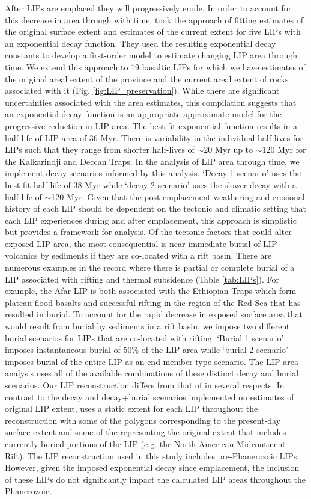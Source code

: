 \documentclass[11pt,letterpaper]{article}
\begin{document}
After LIPs are emplaced they will progressively erode. In order to account for this decrease in area through with time, \cite{Godderis2017a} took the approach of fitting estimates of the original surface extent and estimates of the current extent for five LIPs with an exponential decay function. They used the resulting exponential decay constants to develop a first-order model to estimate changing LIP area through time. We extend this approach to 19 basaltic LIPs for which we have estimates of the original areal extent of the province and the current areal extent of rocks associated with it (Fig. \ref{fig:LIP_preservation}). While there are significant uncertainties associated with the area estimates, this compilation suggests that an exponential decay function is an appropriate approximate model for the progressive reduction in LIP area. The best-fit exponential function results in a half-life of LIP area of 36 Myr. There is variability in the individual half-lives for LIPs such that they range from shorter half-lives of $\sim$20 Myr up to $\sim$120 Myr for the Kalkarindji and Deccan Traps. In the analysis of LIP area through time, we implement decay scenarios informed by this analysis. `Decay 1 scenario' uses the best-fit half-life of 38 Myr while `decay 2 scenario' uses the slower decay with a half-life of $\sim$120 Myr. Given that the post-emplacement weathering and erosional history of each LIP should be dependent on the tectonic and climatic setting that each LIP experiences during and after emplacement, this approach is simplistic but provides a framework for analysis. Of the tectonic factors that could alter exposed LIP area, the most consequential is near-immediate burial of LIP volcanics by sediments if they are co-located with a rift basin. There are numerous examples in the record where there is partial or complete burial of a LIP associated with rifting and thermal subsidence (Table \ref{tab:LIPs}). For example, the Afar LIP is both associated with the Ethiopian Traps which form plateau flood basalts and successful rifting in the region of the Red Sea that has resulted in burial. To account for the rapid decrease in exposed surface area that would result from burial by sediments in a rift basin, we impose two different burial scenarios for LIPs that are co-located with rifting. `Burial 1 scenario' imposes instantaneous burial of 50$\%$ of the LIP area while `burial 2 scenario' imposes burial of the entire LIP as an end-member type scenario. The LIP area analysis uses all of the available combinations of these distinct decay and burial scenarios. Our LIP reconstruction differs from that of \cite{Johansson2018a} in several respects. In contrast to the decay and decay+burial scenarios implemented on estimates of original LIP extent, \cite{Johansson2018a} uses a static extent for each LIP throughout the reconstruction with some of the polygons corresponding to the present-day surface extent and some of the representing the original extent that includes currently buried portions of the LIP (e.g. the North American Midcontinent Rift). The LIP reconstruction used in this study includes pre-Phanerozoic LIPs. However, given the imposed exponential decay since emplacement, the inclusion of these LIPs do not significantly impact the calculated LIP areas throughout the Phanerozoic.
\end{document}
